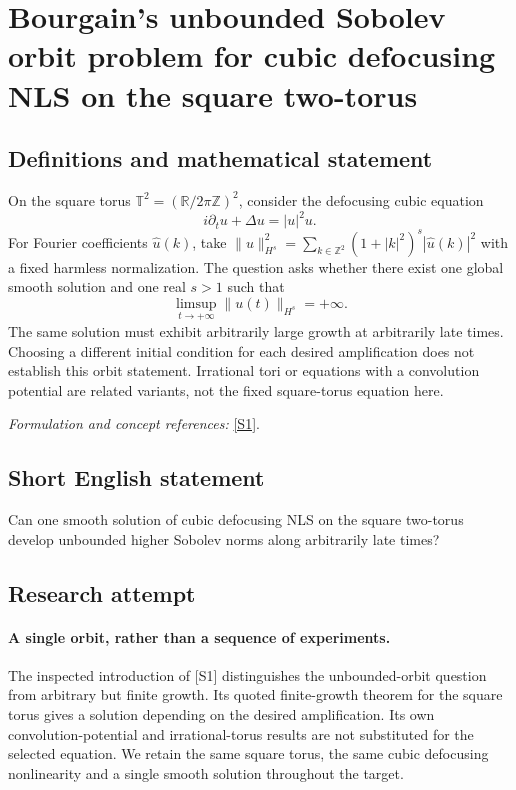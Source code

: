 \documentclass[11pt]{article}
\begin{document}
\section*{\texorpdfstring{Bourgain's unbounded Sobolev orbit problem for cubic defocusing NLS on the square two-torus}{Bourgain's unbounded Sobolev orbit problem for cubic defocusing NLS on the square two-torus}}\label{387}
\subsection{Definitions and mathematical statement}
On the square torus $\mathbb T^2=({\mathbb{R}}/2\pi{\mathbb{Z}})^2$, consider the defocusing cubic equation
\[
 i\partial_tu+\Delta u=|u|^2u.
\]
For Fourier coefficients $\widehat u(k)$, take $\|u\|_{H^s}^2=\sum_{k\in{\mathbb{Z}}^2}(1+|k|^2)^s|\widehat u(k)|^2$ with a fixed harmless normalization. The question asks whether there exist one global smooth solution and one real $s>1$ such that
\[
 \limsup_{t\to+\infty}\|u(t)\|_{H^s}=+\infty.
\]
The same solution must exhibit arbitrarily large growth at arbitrarily late times. Choosing a different initial condition for each desired amplification does not establish this orbit statement. Irrational tori or equations with a convolution potential are related variants, not the fixed square-torus equation here.
\par\smallskip\textit{Formulation and concept references:} \href{https://arxiv.org/html/2308.13468}{[S1]}.

\subsection{Short English statement}
Can one smooth solution of cubic defocusing NLS on the square two-torus develop unbounded higher Sobolev norms along arbitrarily late times?
\subsection{Research attempt}
\paragraph{A single orbit, rather than a sequence of experiments.}
The inspected introduction of [S1] distinguishes the unbounded-orbit
question from arbitrary but finite growth. Its quoted finite-growth
theorem for the square torus gives a solution depending on the desired
amplification. Its own convolution-potential and irrational-torus
results are not substituted for the selected equation. We retain the
same square torus, the same cubic defocusing nonlinearity and a single
smooth solution throughout the target.
\end{document}
